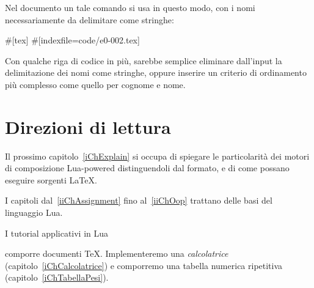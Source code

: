 Nel documento un tale comando si usa in questo modo, con i nomi necessariamente
da delimitare come stringhe:
\begin{lines}
#[tex]
#[indexfile=code/e0-002.tex]
\end{lines}

Con qualche riga di codice in più, sarebbe semplice eliminare dall'input la
delimitazione dei nomi come stringhe, oppure inserire un criterio di ordinamento
più complesso come quello per cognome e nome.


\section{Direzioni di lettura}

Il prossimo capitolo~\ref{iChExplain} si occupa di spiegare le particolarità dei
motori di composizione Lua-powered distinguendoli dal formato, e di come possano
eseguire sorgenti \LaTeX{}.

I capitoli dal~\ref{iiChAssignment} fino al~\ref{iiChOop} trattano delle basi
del linguaggio Lua.

I tutorial applicativi in Lua

comporre documenti \TeX. Implementeremo una \emph{calcolatrice}
(capitolo~\ref{iChCalcolatrice}) e comporremo una tabella numerica ripetitiva
(capitolo~\ref{iChTabellaPesi}).



